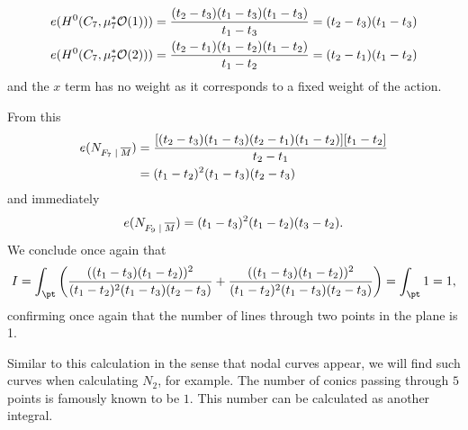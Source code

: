 \documentclass[12pt]{memoir}
\begin{document}
\begin{Ex}
\begin{itemize}
        \begin{gather*}
        e(H^0(C_7,\mu_7^\ast\mathcal{O}(1)))=\frac{(t_2-t_3)(t_1-t_3)(t_1-t_3)}{t_1-t_3}=(t_2-t_3)(t_1-t_3)\\
        e(H^0(C_7,\mu_7^\ast\mathcal{O}(2)))=\frac{(t_2-t_1)(t_1-t_2)(t_1-t_2)}{t_1-t_2}=(t_2-t_1)(t_1-t_2)
        \end{gather*}
        and the $x$ term has no weight as it corresponds to a fixed weight of the action.
    \end{itemize}
     From this
        \begin{align*}
             e(N_{F_7\mid\ov M})&=\frac{[(t_2-t_3)(t_1-t_3)(t_2-t_1)(t_1-t_2)][t_1-t_2]}{t_2-t_1}\\
             &=(t_1-t_2)^2(t_1-t_3)(t_2-t_3)
        \end{align*}
    and immediately
    $$e(N_{F_9\mid\ov M})=(t_1-t_3)^2(t_1-t_2)(t_3-t_2).$$
    We conclude once again that 
    $$I=\int_{\pt}\left(\frac{((t_1-t_3)(t_1-t_2))^2}{(t_1-t_2)^2(t_1-t_3)(t_2-t_3)}+\frac{((t_1-t_3)(t_1-t_2))^2}{(t_1-t_2)^2(t_1-t_3)(t_2-t_3)}\right)=\int_{\pt}1=1,$$
    confirming once again that the number of lines through two points in the plane is 1.
\end{Ex}

Similar to this calculation in the sense that nodal curves appear, we will find such curves when calculating $N_2$, for example. The number of conics passing through $5$ points is famously known to be $1$. This number can be calculated as another integral.
\end{document}
